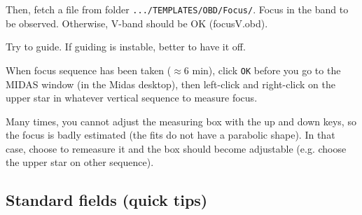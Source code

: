 \documentclass[11pt,fleqn]{book}
\begin{document}
Then, fetch a file from folder \texttt{.../TEMPLATES/OBD/Focus/}.  Focus in the band to be observed. Otherwise, V-band should be OK (focusV.obd).

Try to guide. If guiding is instable, better to have it off.

When focus sequence has been taken ($\approx 6$ min), click \texttt{OK}
before you go to the MIDAS window (in the Midas desktop), then left-click and right-click on the upper star in whatever vertical sequence to measure focus.  

Many times, you cannot adjust the measuring box with the up and down keys, so the focus is badly estimated (the fits do not have a parabolic shape).  In that case, choose to remeasure it and the box should become adjustable (e.g. choose the upper star on other sequence).



\subsection{Standard fields (quick tips)}
\end{document}
